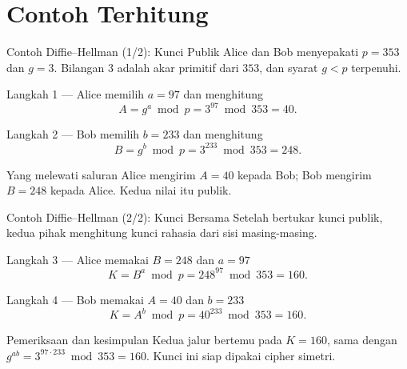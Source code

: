 \documentclass[aspectratio=169,11pt]{beamer}
\begin{document}
\section{Contoh Terhitung}

\begin{frame}{Contoh Diffie--Hellman (1/2): Kunci Publik}
    \footnotesize
    Alice dan Bob menyepakati $p = 353$ dan $g = 3$. Bilangan $3$ adalah
    akar primitif dari $353$, dan syarat $g < p$ terpenuhi.
    \vspace{0.15cm}
    \begin{block}{Langkah 1 --- Alice memilih $a = 97$ dan menghitung}
        \footnotesize
        \[
            A = g^{a} \bmod p = 3^{97} \bmod 353 = 40 .
        \]
    \end{block}
    \begin{block}{Langkah 2 --- Bob memilih $b = 233$ dan menghitung}
        \footnotesize
        \[
            B = g^{b} \bmod p = 3^{233} \bmod 353 = 248 .
        \]
    \end{block}
    \begin{exampleblock}{Yang melewati saluran}
        \footnotesize
        Alice mengirim $A = 40$ kepada Bob; Bob mengirim $B = 248$ kepada
        Alice. Kedua nilai itu publik.
    \end{exampleblock}
\end{frame}

\begin{frame}{Contoh Diffie--Hellman (2/2): Kunci Bersama}
    \footnotesize
    Setelah bertukar kunci publik, kedua pihak menghitung kunci rahasia
    dari sisi masing-masing.
    \vspace{0.15cm}
    \begin{block}{Langkah 3 --- Alice memakai $B = 248$ dan $a = 97$}
        \footnotesize
        \[
            K = B^{a} \bmod p = 248^{97} \bmod 353 = 160 .
        \]
    \end{block}
    \begin{block}{Langkah 4 --- Bob memakai $A = 40$ dan $b = 233$}
        \footnotesize
        \[
            K = A^{b} \bmod p = 40^{233} \bmod 353 = 160 .
        \]
    \end{block}
    \begin{exampleblock}{Pemeriksaan dan kesimpulan}
        \footnotesize
        Kedua jalur bertemu pada $K = 160$, sama dengan
        $g^{ab} = 3^{97 \cdot 233} \bmod 353 = 160$. Kunci ini siap dipakai
        cipher simetri.
    \end{exampleblock}
\end{frame}
\end{document}
